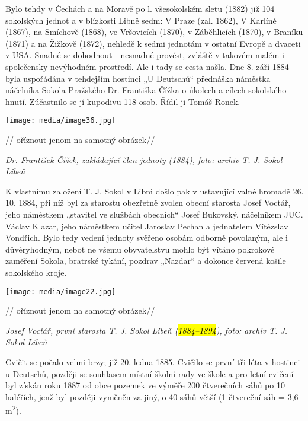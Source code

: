 Bylo tehdy v Čechách a na Moravě po l. všesokolském sletu (1882) již 104
sokolských jednot a v blízkosti Libně sedm: V Praze (zal. 1862), V
Karlíně (1867), na Smíchově (1868), ve Vršovicích (1870), v Záběhlicích
(1870), v Braníku (1871) a na Žižkově (1872), nehledě k sedmi jednotám v
ostatní Evropě a dvaceti v USA. Snadné se dohodnout - nesnadné provést,
zvláště v takovém malém i společensky nevýhodném prostředí. Ale i tady
se cesta našla. Dne 8. září 1884 byla uspořádána v tehdejším hostinci „U
Deutschů`` přednáška náměstka náčelníka Sokola Pražského Dr. Františka
Čížka o úkolech a cílech sokolského hnutí. Zúčastnilo se jí kupodivu 118
osob. Řídil ji Tomáš Ronek.

\texttt{[image: media/image36.jpg]}

// oříznout jenom na samotný obrázek//

\emph{Dr. František Čížek, zakládající člen jednoty (1884), foto: archiv
T. J. Sokol Libeň}

K vlastnímu založení T. J. Sokol v Libni došlo pak v ustavující valné
hromadě 26. 10. 1884, při níž byl za starostu obezřetně zvolen obecní
starosta Josef Voctář, jeho náměstkem „stavitel ve službách obecních``
Josef Bukovský, náčelníkem JUC. Václav Klazar, jeho náměstkem učitel
Jaroslav Pechan a jednatelem Vítězslav Vondřich. Bylo tedy vedení
jednoty svěřeno osobám odborně povolaným, ale i důvěryhodným, neboť ne
všemu obyvatelstvu mohlo být vítáno pokrokové zaměření Sokola, bratrské
tykání, pozdrav „Nazdar`` a dokonce červená košile sokolského kroje.

\texttt{[image: media/image22.jpg]}

// oříznout jenom na samotný obrázek//

\emph{Josef Voctář, první starosta T. J. Sokol Libeň (\hl{1884--⁠⁠⁠⁠⁠⁠1894}),
foto: archiv T. J. Sokol Libeň}

Cvičit se počalo velmi brzy; již 20. ledna 1885. Cvičilo se první tři
léta v hostinci u Deutschů, později se souhlasem místní školní rady ve
škole a pro letní cvičení byl získán roku 1887 od obce pozemek ve výměře
200 čtverečních sáhů po 10 haléřích, jenž byl později vyměněn za jiný, o
40 sáhů větší (1 čtvereční sáh = 3,6 m\textsuperscript{2}).

